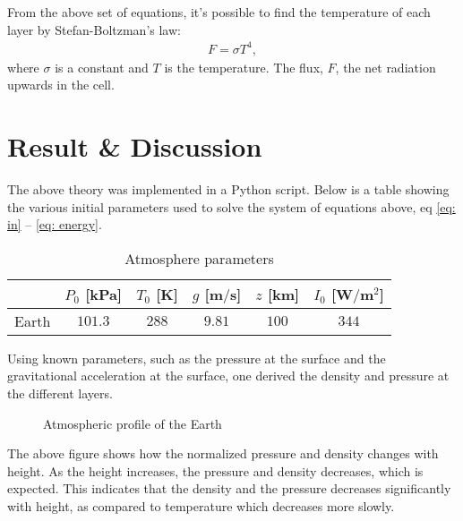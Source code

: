\documentclass[a4paper]{article}
\newcommand{\newparagraph}{\vspace{.5cm}\noindent}
\begin{document}
\newparagraph
From the above set of equations, it's possible to find the temperature of each layer by Stefan-Boltzman's law:
\begin{align}
    F = \sigma T^4,\label{eq: stefan-boltzman law}
\end{align}where $\sigma$ is a constant and $T$ is the temperature. The flux, $F$, the net radiation upwards in the cell.
\section{Result \& Discussion}
The above theory was implemented in a Python script.
Below is a table showing the various initial parameters used to solve the system of equations above, eq \eqref{eq: in} -- \eqref{eq: energy}.
\begin{table}[H]
    \centering 
    \caption{Atmosphere parameters}
    \begin{tabular}{|c|c|c|c|c|c|}\hline
        & $P_0$ [kPa] & $T_0$ [K] & $g$ [m$/$s]& $z$ [km] & $I_0$ [W$/$m$^2$] \\\hline
        Earth & $101.3$ & $288$ & $9.81$ & $100$ & $344$ \\\hline
    \end{tabular}
\end{table}\noindent
Using known parameters, such as the pressure at the surface and the gravitational acceleration at the surface, one derived the density and pressure at the different layers.

\begin{figure}[H]
    \centering
    \caption{Atmospheric profile of the Earth}
    \label{eq: atmospheric profile of earth}
\end{figure}\noindent
The above figure shows how the normalized pressure and density changes with height. As the height increases, the pressure and density decreases, which is expected.
This indicates that the density and the pressure decreases significantly with height, as compared to temperature which decreases more slowly.
\end{document}

